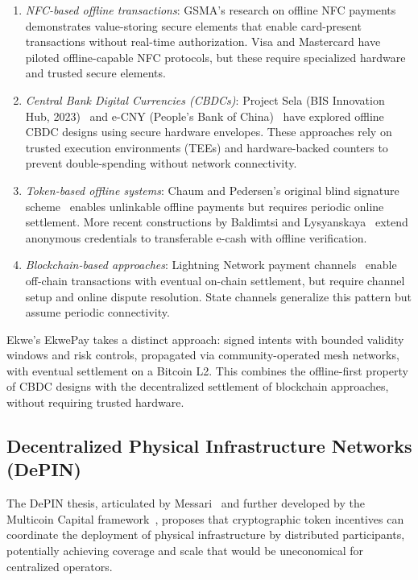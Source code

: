 \documentclass[11pt,a4paper]{article}
\begin{document}
\begin{enumerate}[nosep]
  \item \textit{NFC-based offline transactions}: GSMA's research on offline NFC payments~\cite{gsma_ussd} demonstrates value-storing secure elements that enable card-present transactions without real-time authorization. Visa and Mastercard have piloted offline-capable NFC protocols, but these require specialized hardware and trusted secure elements.

  \item \textit{Central Bank Digital Currencies (CBDCs)}: Project Sela (BIS Innovation Hub, 2023)~\cite{bis_sela} and e-CNY (People's Bank of China)~\cite{ecny_design} have explored offline CBDC designs using secure hardware envelopes. These approaches rely on trusted execution environments (TEEs) and hardware-backed counters to prevent double-spending without network connectivity.

  \item \textit{Token-based offline systems}: Chaum and Pedersen's original blind signature scheme~\cite{chaum_blind} enables unlinkable offline payments but requires periodic online settlement. More recent constructions by Baldimtsi and Lysyanskaya~\cite{baldimtsi_anon} extend anonymous credentials to transferable e-cash with offline verification.

  \item \textit{Blockchain-based approaches}: Lightning Network payment channels~\cite{poon_lightning} enable off-chain transactions with eventual on-chain settlement, but require channel setup and online dispute resolution. State channels generalize this pattern but assume periodic connectivity.
\end{enumerate}

Ekwe's EkwePay takes a distinct approach: signed intents with bounded validity windows and risk controls, propagated via community-operated mesh networks, with eventual settlement on a Bitcoin L2. This combines the offline-first property of CBDC designs with the decentralized settlement of blockchain approaches, without requiring trusted hardware.

\subsection{Decentralized Physical Infrastructure Networks (DePIN)}

The DePIN thesis, articulated by Messari~\cite{messari_depin} and further developed by the Multicoin Capital framework~\cite{multicoin_depin}, proposes that cryptographic token incentives can coordinate the deployment of physical infrastructure by distributed participants, potentially achieving coverage and scale that would be uneconomical for centralized operators.
\end{document}
